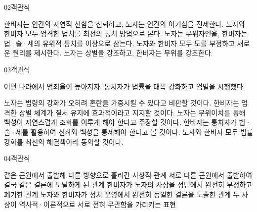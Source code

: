 \documentclass[fs85,seriesWit]{korfarm-base}
\begin{document}
\begin{kfQBlock}{02}{객관식}
\begin{kfChoices}
\kfChoice 한비자는 인간의 자연적 선함을 신뢰하고, 노자는 인간의 이기심을 전제한다.
\kfChoice 노자와 한비자 모두 엄격한 법치를 최선의 통치 방법으로 본다.
\kfChoice 노자는 무위자연을, 한비자는 법·술·세의 유위적 통치를 이상으로 삼는다.
\kfChoice 노자와 한비자 모두 도를 부정하고 새로운 원리를 제시한다.
\kfChoice 노자는 상벌을 강조하고, 한비자는 무위를 강조한다.
\end{kfChoices}
\end{kfQBlock}

\begin{kfQBlock}{03}{객관식}
\begin{kfEvidence}어떤 나라에서 범죄율이 높아지자, 통치자가 법률을 대폭 강화하고 엄벌을 시행했다.\end{kfEvidence}
\begin{kfChoices}
\kfChoice 노자는 법령의 강화가 오히려 혼란을 가중시킬 수 있다고 비판할 것이다.
\kfChoice 한비자는 엄격한 상벌 체계가 질서 유지에 효과적이라고 지지할 것이다.
\kfChoice 노자는 무위이치를 통해 백성이 자연스럽게 조화를 이루게 해야 한다고 주장할 것이다.
\kfChoice 한비자는 통치자가 법·술·세를 활용하여 신하와 백성을 통제해야 한다고 볼 것이다.
\kfChoice 노자와 한비자 모두 법률 강화를 최선의 해결책이라 동의할 것이다.
\end{kfChoices}
\end{kfQBlock}

\begin{kfQBlock}{04}{객관식}
\begin{kfChoices}
\kfChoice 같은 근원에서 출발해 다른 방향으로 흘러간 사상적 관계
\kfChoice 서로 다른 근원에서 출발하여 결국 같은 결론에 도달하게 된 관계
\kfChoice 한비자가 노자의 사상을 정면에서 완전히 부정하고 폐기한 관계
\kfChoice 노자와 한비자가 정치 운영에서 완전히 동일한 결론을 도출한 관계
\kfChoice 두 사상이 역사적·이론적으로 서로 전혀 무관함을 가리키는 표현
\end{kfChoices}
\end{kfQBlock}

\kfEndMC
\end{document}
